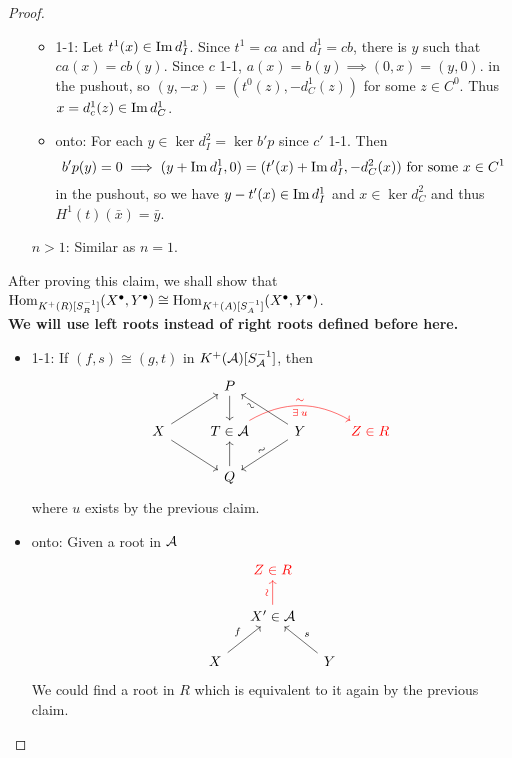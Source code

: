 \begin{theorem}
\begin{proof}
\begin{enumerate}
      \begin{itemize}
        \item 1-1: Let $t^1(x) \in \operatorname{Im} d^1_I$. Since $t^1 = ca$
          and $d^1_I = cb$, there is $y$ such that
          $ca(x) = cb(y)$. Since $c$ 1-1, $a(x) = b(y) \implies (0, x) = (y, 0)$.
          in the pushout, so $(y, -x) = (t^0(z), -d^1_C(z))$ for some $z \in C^0$.
          Thus $x = d^1_c(z) \in \operatorname{Im} d^1_C$.
        \item onto: For each $y \in \ker d_I^2 = \ker b'p$ since $c'$ 1-1.
          Then
          \[ b'p(y) = 0 \implies (y + \operatorname{Im} d^1_I, 0) = (t'(x) + \operatorname{Im} d^1_I, -d^2_C(x))
            \text{ for some } x \in C^1 \]
          in the pushout, so we have $y - t'(x) \in \operatorname{Im} d^1_I$ and
          $ x \in \ker d^2_C$ and thus $H^1(t)(\bar{x}) = \bar{y}$.
      \end{itemize}
    \item[$n > 1$:] Similar as $n = 1$.
    \end{enumerate}
    \medskip

    After proving this claim, we shall show that
    $\operatorname{Hom}_{K^+(R)[S_R^{-1}]}(X^\bullet, Y^\bullet)
    \cong \operatorname{Hom}_{K^+(A)[S^{-1}_A]}(X^\bullet, Y^\bullet)$. \\
    {\bf We will use left roots instead of right roots defined before here.}
    \begin{itemize}
      \item 1-1: If $(f, s) \cong (g, t)$ in $K^+(\mathcal{A})[S^{-1}_{\mathcal{A}}]$, then
        \[ \begin{tikzcd}
            & P \ar[d] & & \\
          X \ar[ru] \ar[rd] & T \in \Ac \ar[rr, bend left, "\sim", "\exists u"', sloped, red] &
          Y \ar[lu, "\sim"', sloped, near end] \ar[ld, "\sim", sloped] & {\color{red} Z \in R} \\
          & Q \ar[u] & &
        \end{tikzcd} \]
      where $u$ exists by the previous claim.
      \item onto: Given a root in $\mathcal{A}$
        \[ \begin{tikzcd}[column sep=small]
            & {\color{red} Z \in R} & \\
            & X' \in \Ac \ar[u, "\rotatebox{90}{\(\sim\)}", red] & \\
            X \ar[ru, "f"] & & Y \ar[lu, "s"']
        \end{tikzcd} \]
      We could find a root in $R$ which is equivalent to it again
      by the previous claim.
    \end{itemize}
  \end{proof}
\end{theorem}

